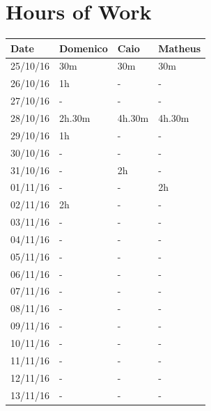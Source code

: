 \documentclass[a4paper]{article}
\begin{document}
\section{Hours of Work}
\begin{tabular}{ | l | l | l | l | }
\hline
	\textbf {Date} & \textbf {Domenico} & \textbf {Caio} & \textbf {Matheus} \\ \hline
	25/10/16& 30m & 30m & 30m \\ \hline
	26/10/16& 1h & -  & -  \\ \hline
	27/10/16&  - & - & -  \\ \hline
	28/10/16& 2h.30m & 4h.30m & 4h.30m \\ \hline
	29/10/16& 1h & -  & - \\ \hline
	30/10/16&  - & - & - \\ \hline
	31/10/16&  - & 2h & - \\ \hline
	01/11/16&  - & - & 2h \\ \hline
	02/11/16&  2h & - & - \\ \hline
	03/11/16&  - & - & - \\ \hline
	04/11/16&  - & - & - \\ \hline
	05/11/16&  - & - & - \\ \hline
	06/11/16&  - & - & - \\ \hline
	07/11/16&  - & - & - \\ \hline
	08/11/16&  - & - & - \\ \hline
	09/11/16&  - & - & - \\ \hline
	10/11/16&  - & - & - \\ \hline
	11/11/16&  - & - & - \\ \hline
	12/11/16&  - & - & - \\ \hline
	13/11/16&  - & - & - \\ \hline
\end{tabular}

\newpage
\end{document}
